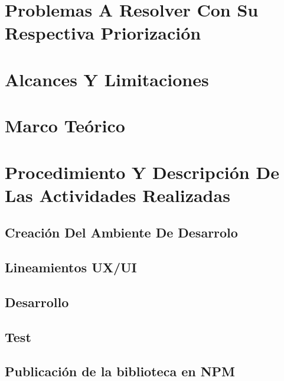 \documentclass[a4paper,12pt, listof=totoc]{report}
\begin{document}
		\chapter {Problemas A Resolver Con Su Respectiva Priorización }
			
			
		\chapter {Alcances Y Limitaciones }
				
		
		\chapter {Marco Teórico  }
			
		
		\chapter {Procedimiento Y Descripción De Las Actividades Realizadas}
			
			
			\section {Creación Del Ambiente De Desarrolo}
				
				
			\section {Lineamientos UX/UI}
				
				
			\section {Desarrollo}
				
				
			\section {Test }
				
				
			\section {Publicación de la biblioteca en NPM }
				
			
\end{document}
